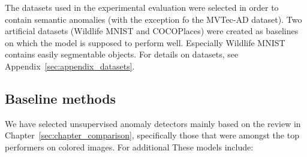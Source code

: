 The datasets used in the experimental evaluation were selected in order to contain semantic anomalies (with the exception fo the MVTec-AD dataset). Two artificial datasets (Wildlife MNIST and COCOPlaces) were created as baselines on which the model is supposed to perform well. Especially Wildlife MNIST contains easily segmentable objects. For details on datasets, see Appendix~\ref{sec:appendix_datasets}.

\subsection{Baseline methods}
We have selected unsupervised anomaly detectors mainly based on the review in Chapter~\ref{sec:chapter_comparison}, specifically those that were amongst the top performers on colored images. For additional These models include:

